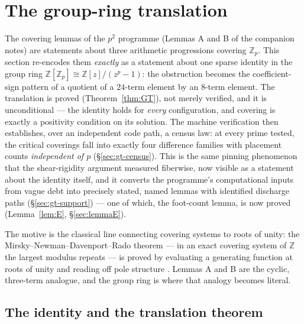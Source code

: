 \documentclass[11pt,a4paper]{article}
\numberwithin{equation}{section}
\theoremstyle{plain}
\theoremstyle{plain}
\theoremstyle{definition}
\theoremstyle{remark}
\newcommand{\Z}{\mathbb{Z}}
\begin{document}

\section{The group-ring translation}\label{sec:groupring}

The covering lemmas of the $p^2$ programme (Lemmas A and B of the companion
notes) are statements about three arithmetic progressions covering $\Z_p$.
This section re-encodes them \emph{exactly} as a statement about one sparse
identity in the group ring $\Z[\Z_p]\cong\Z[z]/(z^p-1)$: the obstruction
becomes the coefficient-sign pattern of a quotient of a $24$-term element by
an $8$-term element. The translation is proved (Theorem~\ref{thm:GT}), not
merely verified, and it is unconditional --- the identity holds for
\emph{every} configuration, and covering is exactly a positivity condition on
its solution. The machine verification then establishes, over an independent
code path, a census law: at every prime tested, the critical coverings fall
into exactly four difference families with placement counts \emph{independent
of $p$} (\S\ref{sec:gt-census}). This is the same pinning phenomenon that the
shear-rigidity argument measured fiberwise, now visible as a statement about
the identity itself, and it converts the programme's computational inputs
from vague debt into precisely stated, named lemmas with identified
discharge paths (\S\ref{sec:gt-support}) --- one of which, the foot-count
lemma, is now proved (Lemma~\ref{lem:E}, \S\ref{sec:lemmaE}).

The motive is the classical line connecting covering systems to roots of
unity: the Mirsky--Newman--Davenport--Rado theorem --- in an exact covering
system of $\Z$ the largest modulus repeats --- is proved by evaluating a
generating function at roots of unity and reading off pole structure
\cite{MirskyNewman}. Lemmas A and B are the cyclic, three-term analogue, and
the group ring is where that analogy becomes literal.

\subsection{The identity and the translation theorem}\label{sec:gt-identity}
\end{document}
